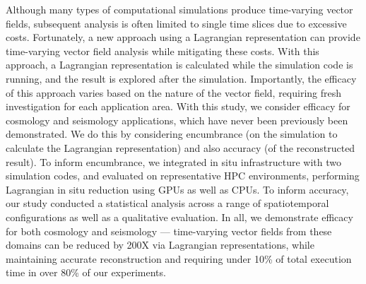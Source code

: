Although many types of computational simulations produce time-varying vector fields, 
subsequent analysis is often limited to single time slices due to excessive costs.
%
Fortunately, a new approach using a Lagrangian representation can 
provide time-varying vector field analysis while mitigating these costs.
%
With this approach, a Lagrangian representation is calculated while the simulation code is running, and the result is explored after the simulation.
%
Importantly, 
 the efficacy of this approach varies based on the nature of the vector field, 
requiring fresh investigation for each application area.
%
With this study, we consider efficacy for cosmology and seismology
applications, which have never been previously been demonstrated.
%
We do this by considering encumbrance (on the simulation to calculate the
Lagrangian representation) and also accuracy (of the reconstructed result).
%
To inform encumbrance, we 
integrated in situ infrastructure with two simulation codes, 
and evaluated on representative HPC environments,
performing Lagrangian in situ reduction using GPUs as well as CPUs.
%
To inform accuracy, our study conducted a statistical analysis across a range of spatiotemporal configurations as well as a qualitative evaluation.
In all, we demonstrate efficacy for both cosmology and seismology --- time-varying vector fields from these domains can be reduced by 200X via Lagrangian representations, while maintaining accurate reconstruction and requiring under 10\% of total execution time in over 80\% of our experiments.
